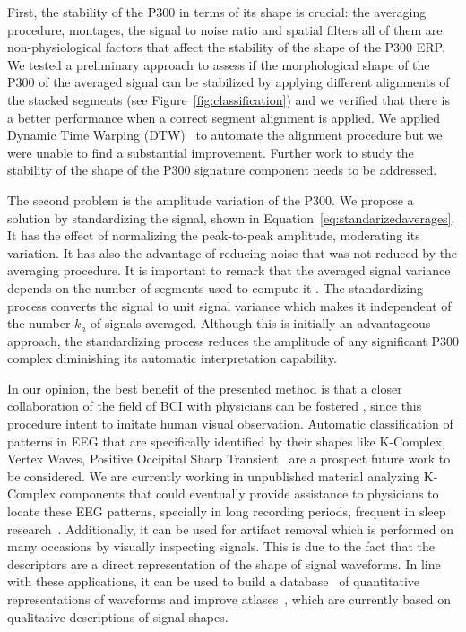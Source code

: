 \documentclass[utf8]{frontiersSCNS} %
\begin{document}
First, the stability of the P300 in terms of its shape is crucial: the averaging procedure, montages, the signal to noise ratio and spatial filters all of them are non-physiological factors that affect the stability of the shape of the P300 ERP.  We tested a preliminary approach to assess if the morphological shape of the P300 of the averaged signal can be stabilized by applying different alignments of the stacked segments (see Figure~\ref{fig:classification}) and we verified that there is a better performance when a correct segment alignment is applied.  We applied Dynamic Time Warping (DTW)~\citep{Casarotto2005} to automate the alignment procedure but we were unable to find a substantial improvement.  Further work to study the stability of the shape of the P300 signature component needs to be addressed.

The second problem is the amplitude variation of the P300. We propose a solution by standardizing the signal, shown in Equation~\ref{eq:standarizedaverages}. It has the effect of normalizing the peak-to-peak amplitude, moderating its variation. It has also the advantage of reducing noise that was not reduced by the averaging procedure.   It is important to remark that the averaged signal variance depends on the number of segments used to compute it \citep{van2006signal}.  The standardizing process converts the signal to unit signal variance which makes it independent of the number $k_a$ of signals averaged.   Although this is initially an advantageous approach, the standardizing process reduces the amplitude of any significant P300 complex diminishing its automatic interpretation capability.

In our opinion, the best benefit of the presented method is that a closer collaboration of the field of BCI with physicians can be fostered \citep{Chavarriaga2017}, since this procedure intent to imitate human visual observation.  Automatic classification of patterns in EEG that are specifically identified by their shapes like K-Complex, Vertex Waves, Positive Occipital Sharp Transient~\citep{Hartman2005} are a prospect future work to be considered. We are currently working in unpublished material analyzing K-Complex components that could eventually provide  assistance to physicians to locate these EEG patterns, specially in long recording periods, frequent in sleep research~\citep{Michel2012}.  
Additionally, it can be used for artifact removal which is performed on many occasions by visually inspecting signals.  This is due to the fact that the descriptors are a direct representation of the shape of signal waveforms. In line with these applications,  it can be used to build a database~\citep{Chavarriaga2017} of quantitative representations of waveforms and improve atlases~\citep{Hartman2005}, which are currently based on qualitative descriptions of signal shapes.
\end{document}

